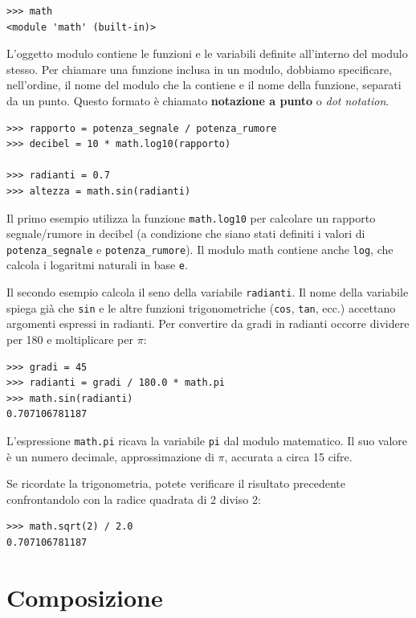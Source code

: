 \documentclass[10pt]{book}
\begin{document}
\begin{verbatim}
>>> math
<module 'math' (built-in)>
\end{verbatim}
%
L'oggetto modulo contiene le funzioni e le variabili definite all'interno del modulo stesso. Per chiamare una funzione inclusa in un modulo, dobbiamo specificare, nell'ordine, il nome del modulo che la contiene e il nome della funzione, separati da un punto. Questo formato è chiamato {\bf notazione a punto} o {\em dot notation}.

\begin{verbatim}
>>> rapporto = potenza_segnale / potenza_rumore
>>> decibel = 10 * math.log10(rapporto)

>>> radianti = 0.7
>>> altezza = math.sin(radianti)
\end{verbatim}
%
Il primo esempio utilizza la funzione \verb"math.log10" per calcolare un rapporto segnale/rumore in decibel (a condizione che siano stati definiti i valori di \verb"potenza_segnale" e \verb"potenza_rumore").  Il modulo math contiene anche {\tt log}, che calcola i logaritmi naturali in base {\tt e}.


Il secondo esempio calcola il seno della variabile {\tt radianti}. Il nome della variabile spiega già che {\tt sin} e le altre funzioni trigonometriche ({\tt cos}, {\tt tan}, ecc.) accettano argomenti espressi in radianti. Per convertire da gradi in radianti occorre dividere per 180 e moltiplicare per $\pi$:

\begin{verbatim}
>>> gradi = 45
>>> radianti = gradi / 180.0 * math.pi
>>> math.sin(radianti)
0.707106781187
\end{verbatim}
%
L'espressione {\tt math.pi} ricava la variabile {\tt pi} dal modulo matematico. Il suo valore è un numero decimale, approssimazione di $\pi$, accurata a circa 15 cifre. 

Se ricordate la trigonometria, potete verificare il risultato precedente confrontandolo con la radice quadrata di 2 diviso 2:

\begin{verbatim}
>>> math.sqrt(2) / 2.0
0.707106781187
\end{verbatim}
%

\section{Composizione}
\end{document}
